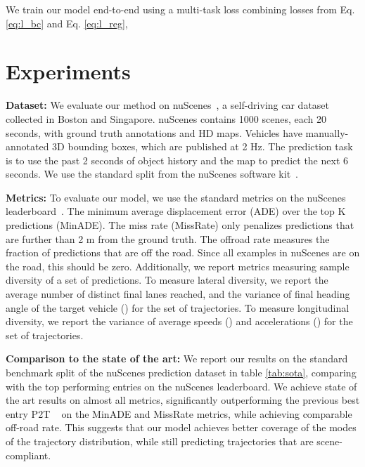 \documentclass{article}
\begin{document}
 




We train our model end-to-end using a multi-task loss combining losses from Eq. \ref{eq:l_bc} and Eq. \ref{eq:l_reg},














\vspace{-2mm}

\section{Experiments}
\label{sec:results}

\textbf{Dataset:} We evaluate our method on nuScenes~\citep{nuscenes2019}, a self-driving car dataset collected in Boston and Singapore.
nuScenes contains 1000 scenes, each 20 seconds, with ground truth annotations and HD maps.
Vehicles have manually-annotated 3D bounding boxes, which are published at 2 Hz.
The prediction task is to use the past 2 seconds of object history and the map to predict the next 6 seconds.
We use the standard split from the nuScenes software kit~\citep{nuScenes-website}.

\textbf{Metrics:} To evaluate our model, we use the standard metrics on the nuScenes leaderboard~\citep{nuScenes-website}.
The minimum average displacement error (ADE) over the top K predictions (MinADE).
The miss rate (MissRate) only penalizes predictions that are further than 2 m from the ground truth. The offroad rate measures the fraction of predictions that are off the road. Since all examples in nuScenes are on the road, this should be zero. Additionally, we report metrics measuring sample diversity of a set of  predictions. To measure lateral diversity, we report the average number of distinct final lanes reached, and the variance of final heading angle of the target vehicle () for the set of  trajectories. To measure longitudinal diversity, we report the variance of average speeds () and accelerations () for the set of  trajectories. 




\textbf{Comparison to the state of the art:} We report our results on the standard benchmark split of the nuScenes prediction dataset in table \ref{tab:sota}, comparing with the top performing entries on the nuScenes leaderboard. We achieve state of the art results on almost all metrics, significantly outperforming the previous best entry P2T ~\citep{deo2021p2t} on the MinADE and MissRate metrics, while achieving comparable off-road rate. This suggests that our model achieves better coverage of the modes of the trajectory distribution, while still predicting trajectories that are scene-compliant.    
\end{document}
